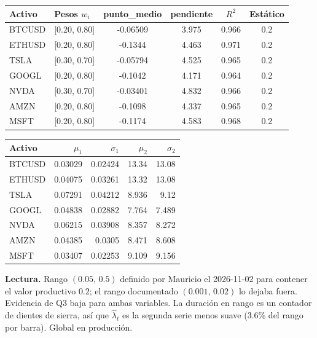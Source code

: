 \documentclass[11pt,a4paper]{article}
\begin{document}
\begin{center}\end{center}
\begin{center}\small\setlength{\tabcolsep}{5pt}
\begin{tabular}{llcccc}\toprule
Activo & Pesos $w_i$ & punto\_medio & pendiente & $R^2$ & Estático \\\midrule
BTCUSD & [0.20, 0.80] & -0.06509 & 3.975 & 0.966 & 0.2 \\
ETHUSD & [0.20, 0.80] & -0.1344 & 4.463 & 0.971 & 0.2 \\
TSLA & [0.30, 0.70] & -0.05794 & 4.525 & 0.965 & 0.2 \\
GOOGL & [0.20, 0.80] & -0.1042 & 4.171 & 0.964 & 0.2 \\
NVDA & [0.30, 0.70] & -0.03401 & 4.832 & 0.966 & 0.2 \\
AMZN & [0.20, 0.80] & -0.1098 & 4.337 & 0.965 & 0.2 \\
MSFT & [0.20, 0.80] & -0.1174 & 4.583 & 0.968 & 0.2 \\
\bottomrule\end{tabular}

\medskip
\begin{tabular}{lrrrr}\toprule
Activo & $\mu_1$ & $\sigma_1$ & $\mu_2$ & $\sigma_2$ \\\midrule
BTCUSD & 0.03029 & 0.02424 & 13.34 & 13.08 \\
ETHUSD & 0.04075 & 0.03261 & 13.32 & 13.08 \\
TSLA & 0.07291 & 0.04212 & 8.936 & 9.12 \\
GOOGL & 0.04838 & 0.02882 & 7.764 & 7.489 \\
NVDA & 0.06215 & 0.03908 & 8.357 & 8.272 \\
AMZN & 0.04385 & 0.0305 & 8.471 & 8.608 \\
MSFT & 0.03407 & 0.02253 & 9.109 & 9.156 \\
\bottomrule\end{tabular}\end{center}
\textbf{Lectura.} Rango $(0.05,\,0.5)$ definido por Mauricio el 2026-11-02 para contener el valor productivo $0.2$; el rango documentado $(0.001,\,0.02)$ lo dejaba fuera. Evidencia de Q3 baja para ambas variables. La duración en rango es un contador de dientes de sierra, así que $\hat\lambda_t$ es la segunda serie menos suave (3.6\% del rango por barra). Global en producción.
\newpage
\end{document}
